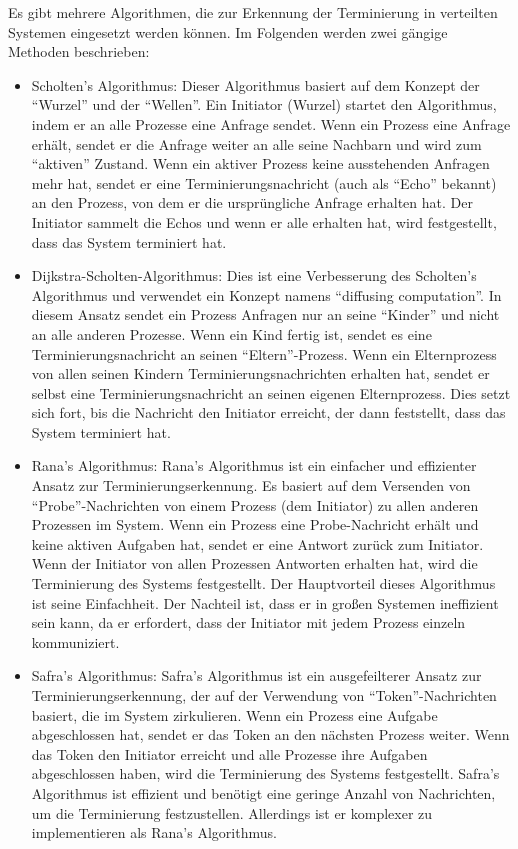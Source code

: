 Es gibt mehrere Algorithmen, die zur Erkennung der Terminierung in verteilten Systemen eingesetzt werden können. Im Folgenden werden zwei gängige Methoden beschrieben:
\begin{itemize}
\item Scholten's Algorithmus: Dieser Algorithmus basiert auf dem Konzept der \enquote{Wurzel} und der \enquote{Wellen}. Ein Initiator (Wurzel) startet den Algorithmus, indem er an alle Prozesse eine Anfrage sendet. Wenn ein Prozess eine Anfrage erhält, sendet er die Anfrage weiter an alle seine Nachbarn und wird zum \enquote{aktiven} Zustand. Wenn ein aktiver Prozess keine ausstehenden Anfragen mehr hat, sendet er eine Terminierungsnachricht (auch als \enquote{Echo} bekannt) an den Prozess, von dem er die ursprüngliche Anfrage erhalten hat. Der Initiator sammelt die Echos und wenn er alle erhalten hat, wird festgestellt, dass das System terminiert hat.
\item Dijkstra-Scholten-Algorithmus: Dies ist eine Verbesserung des Scholten's Algorithmus und verwendet ein Konzept namens \enquote{diffusing computation}. In diesem Ansatz sendet ein Prozess Anfragen nur an seine \enquote{Kinder} und nicht an alle anderen Prozesse. Wenn ein Kind fertig ist, sendet es eine Terminierungsnachricht an seinen \enquote{Eltern}-Prozess. Wenn ein Elternprozess von allen seinen Kindern Terminierungsnachrichten erhalten hat, sendet er selbst eine Terminierungsnachricht an seinen eigenen Elternprozess. Dies setzt sich fort, bis die Nachricht den Initiator erreicht, der dann feststellt, dass das System terminiert hat.
\item Rana's Algorithmus: Rana's Algorithmus ist ein einfacher und effizienter Ansatz zur Terminierungserkennung. Es basiert auf dem Versenden von \enquote{Probe}-Nachrichten von einem Prozess (dem Initiator) zu allen anderen Prozessen im System. Wenn ein Prozess eine Probe-Nachricht erhält und keine aktiven Aufgaben hat, sendet er eine Antwort zurück zum Initiator. Wenn der Initiator von allen Prozessen Antworten erhalten hat, wird die Terminierung des Systems festgestellt. Der Hauptvorteil dieses Algorithmus ist seine Einfachheit. Der Nachteil ist, dass er in großen Systemen ineffizient sein kann, da er erfordert, dass der Initiator mit jedem Prozess einzeln kommuniziert.
\item Safra's Algorithmus: Safra's Algorithmus ist ein ausgefeilterer Ansatz zur Terminierungserkennung, der auf der Verwendung von \enquote{Token}-Nachrichten basiert, die im System zirkulieren. Wenn ein Prozess eine Aufgabe abgeschlossen hat, sendet er das Token an den nächsten Prozess weiter. Wenn das Token den Initiator erreicht und alle Prozesse ihre Aufgaben abgeschlossen haben, wird die Terminierung des Systems festgestellt. Safra's Algorithmus ist effizient und benötigt eine geringe Anzahl von Nachrichten, um die Terminierung festzustellen. Allerdings ist er komplexer zu implementieren als Rana's Algorithmus.

\end{itemize}
